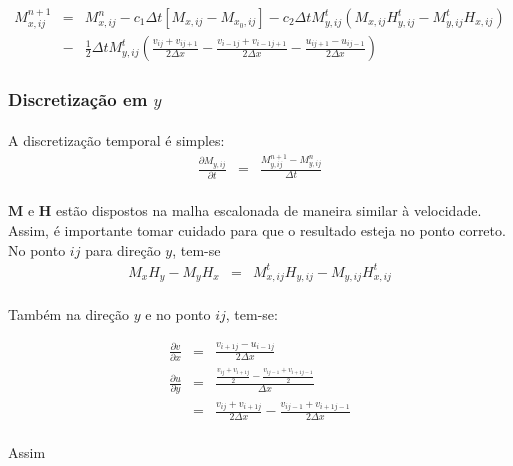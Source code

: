 \documentclass[eletromagnetismo.tex]{subfiles}
\begin{document}
\begin{eqnarray}
M_{x,ij}^{n+1} & = & M_{x,ij}^n -c_1\Delta t[M_{x,ij} - M_{x_0,ij}]-c_2 \Delta t M_{y,ij}^t(M_{x,ij} H_{y,ij}^t - M_{y,ij}^t H_{x,ij})\nonumber \\
&-&\frac{1}{2}\Delta t M_{y,ij}^t\left(\frac{v_{ij} + v_{ij+1}}{2\Delta x} - \frac{v_{i-1j} + v_{i-1j+1}}{2\Delta x} - \frac{u_{ij+1} - u_{ij-1}}{2\Delta x}\right)
\end{eqnarray}

\subsubsection{Discretização em $y$}

\paragraph{} A discretização temporal é simples:
\begin{eqnarray}
	\frac{\partial M_{y,ij}}{\partial t} & = & \frac{M_{y,ij}^{n+1} - M_{y,ij}^n}{\Delta t}
\end{eqnarray}

\paragraph{} $\mathbf{M}$ e $\mathbf{H}$ estão dispostos na malha escalonada de maneira similar à velocidade. Assim, é importante tomar cuidado para que o resultado esteja no ponto correto. No ponto $ij$ para direção $y$, tem-se \begin{eqnarray}
M_x H_y - M_y H_x & = & M_{x,ij}^t H_{y,ij} - M_{y,ij} H_{x,ij}^t
\end{eqnarray}

\paragraph{} Também na direção $y$ e no ponto $ij$, tem-se:

\begin{eqnarray}
	\frac{\partial v}{\partial x} & = & \frac{v_{i+1j} - u_{i-1j}}{2\Delta x}\\
	\frac{\partial u}{\partial y} & = & \frac{\frac{v_{ij} + v_{i+1j}}{2} - \frac{v_{ij-1} + v_{i+1j-1}}{2}}{\Delta x}\\
	&=& \frac{v_{ij} + v_{i+1j}}{2\Delta x} - \frac{v_{ij-1} + v_{i+1j-1}}{2\Delta x}
\end{eqnarray}

\paragraph{} Assim
\end{document}
